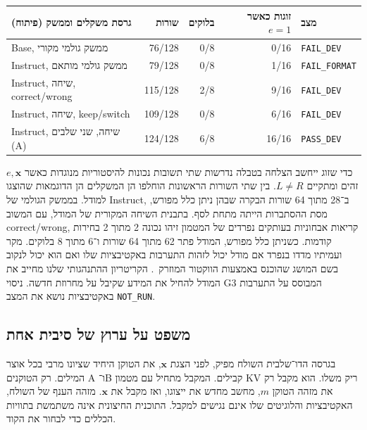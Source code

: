 \documentclass[11pt,a4paper]{article}
\DeclareRobustCommand{\textenglish}[1]{\foreignlanguage{english}{#1}}
\theoremstyle{definition}
\begin{document}
\begin{center}\small
\begin{tabularx}{\linewidth}{@{}Xrrrl@{}}\toprule
גרסת משקלים וממשק (פיתוח) & שורות & בלוקים & זוגות כאשר $e=1$ & מצב \\\midrule
\textenglish{Base}, ממשק גולמי מקורי & 76/128 & 0/8 & 0/16 & \textenglish{\texttt{FAIL\_DEV}}\\
\textenglish{Instruct}, ממשק גולמי מותאם & 79/128 & 0/8 & 1/16 & \textenglish{\texttt{FAIL\_FORMAT}}\\
\textenglish{Instruct}, שיחה, \textenglish{correct/wrong} & 115/128 & 2/8 & 9/16 & \textenglish{\texttt{FAIL\_DEV}}\\
\textenglish{Instruct}, שיחה, \textenglish{keep/switch} & 109/128 & 0/8 & 6/16 & \textenglish{\texttt{FAIL\_DEV}}\\
\textenglish{Instruct}, שיחה, שני שלבים (\textenglish{A}) & 124/128 & 6/8 & 16/16 & \textenglish{\texttt{PASS\_DEV}}\\
\bottomrule\end{tabularx}
\end{center}
כדי שזוג ייחשב הצלחה בטבלה נדרשות שתי תשובות נכונות להיסטוריות מנוגדות כאשר $e,\mathbf{x}$ זהים ומתקיים $L\ne R$. בין שתי השורות הראשונות הוחלפו הן המשקלים הן הדוגמאות שהוצגו למודל. בממשק הגולמי של \textenglish{Instruct}, ב־28 מתוך 64 שורות הבקרה שבהן ניתן כלל מפורש, מסת ההסתברות הייתה מתחת לסף. בתבנית השיחה המקורית של המודל, עם המשוב \textenglish{correct/wrong}, קריאות אבחוניות בעותקים נפרדים של המטמון זיהו נכונה 2 מתוך 2 בחירות קודמות. כשניתן כלל מפורש, המודל פתר 62 מתוך 64 שורות ו־6 מתוך 8 בלוקים. מקר ועמיתיו מדדו בנפרד אם מודל יכול לזהות התערבות באקטיבציות שלו ואם הוא יכול לנקוב בשם המושג שהוכנס באמצעות הווקטור המוזרק~\cite{macar2026}. הקריטריון ההתנהגותי שלנו מחייב את המודל להחיל את המידע שקיבל על מחרוזת חדשה. ניסוי \textenglish{G3} המבוסס על התערבות באקטיבציות נושא את המצב \textenglish{\texttt{NOT\_RUN}}.

\subsection{משפט על ערוץ של סיבית אחת}
בגרסה הדו־שלבית השולח מפיק, לפני הצגת $\mathbf{x}$, את הטוקן היחיד שציונו מרבי בכל אוצר המילים. רק הטוקנים \textenglish{A} ו־\textenglish{B} קבילים. המקבל מתחיל עם מטמון \textenglish{KV} ריק משלו. הוא מקבל רק את מזהה הטוקן $m$, מחשב מחדש את ייצוגו, ואז מקבל את $\mathbf{x}$. מזהה הענף של השולח, האקטיבציות והלוגיטים שלו אינם נגישים למקבל. התוכנית החיצונית אינה משתמשת בתוויות הכללים כדי לבחור את הקוד.
\end{document}
